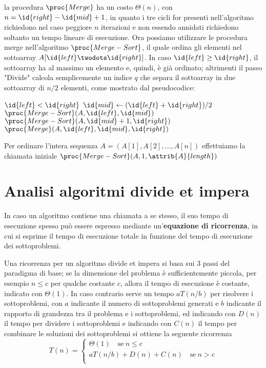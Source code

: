 la procedura $\proc{Merge}$ ha un costo $\Theta(n)$, con $n = \id{right} - \id{mid} + 1$, in quanto
i tre cicli for presenti nell'algoritmo richiedono nel caso peggiore $n$ iterazioni
e non essendo annidati richiedono soltanto un tempo lineare di esecuzione.
Ora possiamo utilizzare le procedura merge nell'algoritmo $\proc{Merge-Sort}$, il quale
ordina gli elementi nel sottoarray $A[\id{left}\twodots \id{right}]$.
In caso $\id{left} \geq \id{right}$, il sottoarray ha al massimo un elemento e, quindi, è già ordinato;
altrimenti il passo "Divide" calcola semplicemente un indice $q$ che separa il sottoarray
in due sottoarray di $n/2$ elementi, come mostrato dal pseudocodice:
\begin{codebox}
\li \If $\id{left} < \id{right}$
    \Then
\li     $\id{mid} \gets (\id{left} + \id{right})/ 2$
\li     $\proc{Merge-Sort}(A,\id{left},\id{mid})$
\li     $\proc{Merge-Sort}(A,\id{mid} + 1,\id{right})$
\li     $\proc{Merge}(A,\id{left},\id{mid},\id{right})$
    \End
\end{codebox}

Per ordinare l'intera sequenza $A = (A[1],A[2],\dots,A[n])$ effettuiamo la chiamata
iniziale $\proc{Merge-Sort}(A,1,\attrib{A}{length})$

\section{Analisi algoritmi divide et impera}
In caso un algoritmo contiene una chiamata a se stesso, il suo tempo di esecuzione
spesso può essere espresso mediante un'\textbf{equazione di ricorrenza}, in cui
si esprime il tempo di esecuzione totale in funzione del tempo di esecuzione dei sottoproblemi.

Una ricorrenza per un algoritmo divide et impera si basa sui 3 passi del paradigma di base;
se la dimensione del problema è sufficientemente piccola,
per esempio $n \leq c$ per qualche costante $c$, allora il tempo di esecuzione è
costante, indicato con $\Theta(1)$.
In caso contrario serve un tempo $aT(n/b)$ per risolvere i sottoproblemi, con $a$
indicante il numero di sottoproblemi generati e $b$ indicante il rapporto di grandezza
tra il problema e i sottoproblemi, ed indicando con $D(n)$ il tempo per dividere
i sottoproblemi e indicando con $C(n)$ il tempo per combinare le soluzioni dei
sottoproblemi si ottiene la seguente ricorrenza
\begin{equation*}
    T(n) = \begin{cases} \Theta(1) \quad \text{se} \ n \leq c \\
                         aT(n/b) + D(n) + C(n) \quad \text{se} \ n > c\\
            \end{cases}
\end{equation*}

